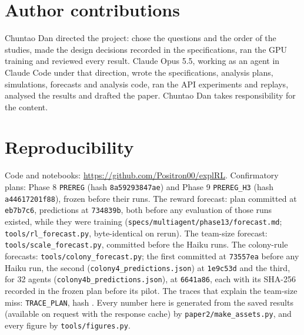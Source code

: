 \documentclass{article}
\begin{document}
\section*{Author contributions}
Chuntao Dan directed the project: chose the questions and the order of the studies, made the design decisions recorded in the specifications, ran the GPU training and reviewed every result. Claude Opus 5.5, working as an agent in Claude Code under that direction, wrote the specifications, analysis plans, simulations, forecasts and analysis code, ran the API experiments and replays, analysed the results and drafted the paper. Chuntao Dan takes responsibility for the content.




\appendix
\section{Reproducibility}
Code and notebooks: \url{https://github.com/Positron00/explRL}. Confirmatory plans: Phase 8 \texttt{PREREG} (hash \texttt{8a59293847ae}) and Phase 9 \texttt{PREREG\_H3} (hash \texttt{a44617201f88}), frozen before their runs. The reward forecast: plan committed at \texttt{eb7b7c6}, predictions at \texttt{734839b}, both before any evaluation of those runs existed, while they were training (\texttt{specs/multiagent/phase13/forecast.md}; \texttt{tools/rl\_forecast.py}, byte-identical on rerun). The team-size forecast: \texttt{tools/scale\_forecast.py}, committed before the Haiku runs. The colony-rule forecasts: \texttt{tools/colony\_forecast.py}; the first committed at \texttt{73557ea} before any Haiku run, the second (\texttt{colony4\_predictions.json}) at \texttt{1e9c53d} and the third, for 32 agents (\texttt{colony4b\_predictions.json}), at \texttt{6641a86}, each with its SHA-256 recorded in the frozen plan before its pilot. The traces that explain the team-size miss: \texttt{TRACE\_PLAN}, hash \texttt{\TracePlanHash}. Every number here is generated from the saved results (available on request with the response cache) by \texttt{paper2/make\_assets.py}, and every figure by \texttt{tools/figures.py}.
\end{document}
